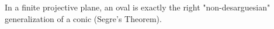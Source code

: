 In a finite projective plane, an oval is exactly the right "non-desarguesian" generalization of a conic (Segre's Theorem).
